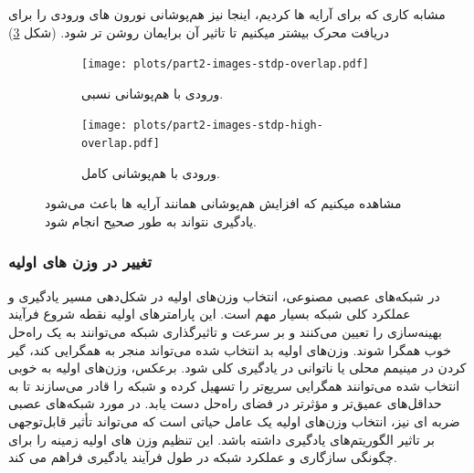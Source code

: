         مشابه کاری که برای آرایه ها کردیم، اینجا نیز هم‌پوشانی نورون های ورودی را برای دریافت محرک بیشتر میکنیم تا تاثیر آن برایمان روشن تر شود.
        (شکل \ref{fig:part2-images-stdp-overlap})
        \begin{figure}[htbp]
            \centering
            \captionsetup{width=.9\linewidth}
            \begin{subfigure}[b]{0.9\textwidth}
                \centering
                \texttt{[image: plots/part2-images-stdp-overlap.pdf]}
                \caption{ورودی با هم‌پوشانی نسبی.}
                \label{fig:part2-images-stdp-norm-overlap}
            \end{subfigure}
            \begin{subfigure}[b]{0.9\textwidth}
                \centering
                \texttt{[image: plots/part2-images-stdp-high-overlap.pdf]}
                \caption{ورودی با هم‌پوشانی کامل.}
                \label{fig:part2-images-stdp-high-overlap}
            \end{subfigure}
            \caption{مشاهده میکنیم که افزایش هم‌پوشانی همانند آرایه ها باعث می‌شود یادگیری نتواند به طور صحیح انجام شود.}
            \label{fig:part2-images-stdp-overlap}
        \end{figure}

        \clearpage
        \subsubsection*{تغییر در وزن های اولیه}
            در شبکه‌های عصبی مصنوعی، انتخاب وزن‌های اولیه در شکل‌دهی مسیر یادگیری و عملکرد کلی شبکه بسیار مهم است. این پارامترهای اولیه نقطه شروع فرآیند بهینه‌سازی را تعیین می‌کنند و بر سرعت و تاثیرگذاری شبکه می‌توانند به یک راه‌حل خوب همگرا شوند. وزن‌های اولیه بد انتخاب شده می‌تواند منجر به همگرایی کند، گیر کردن در مینیمم محلی یا ناتوانی در یادگیری کلی شود. برعکس، وزن‌های اولیه به خوبی انتخاب شده می‌توانند همگرایی سریع‌تر را تسهیل کرده و شبکه را قادر می‌سازند تا به حداقل‌های عمیق‌تر و مؤثرتر در فضای راه‌حل دست یابد. 
            در مورد شبکه‌های عصبی ضربه ای نیز، انتخاب وزن‌های اولیه یک عامل حیاتی است که می‌تواند تأثیر قابل‌توجهی بر تاثیر الگوریتم‌های یادگیری داشته باشد. این تنظیم وزن های اولیه زمینه را برای چگونگی سازگاری و عملکرد شبکه در طول فرآیند یادگیری فراهم می کند.

